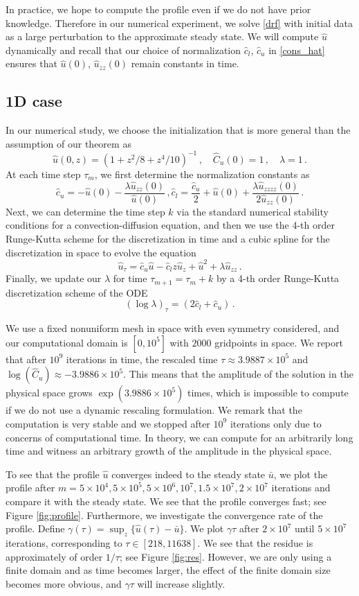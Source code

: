\documentclass[12pt]{caltech_thesis}
\numberwithin{equation}{section}
\begin{document}
In practice, we hope to compute the profile even if we do not have prior knowledge. Therefore in our numerical experiment, we solve  \eqref{drf} with initial data as a large perturbation to the approximate steady state. We will compute $\hat{u}$ dynamically and recall that  our choice of normalization $\hat{c}_l$, $\hat{c}_u$ in \eqref{cons_hat} ensures that $\hat{u}(0)$, $\hat{u}_{zz}(0)$ remain constants in time.  

\subsection{1D case}


In our numerical study, we choose the initialization that is more general than the assumption of our theorem as $$\hat{u}(0,z)=(1+z^2/8+z^4/10)^{-1}\,, \quad\hat{C}_u(0)=1\,, \quad\lambda=1\,.$$
At each time step $\tau_m$, we first determine the normalization constants as $$\hat{c}_u=-\hat{u}(0)-\frac{\lambda\hat{u}_{zz}(0)}{\hat{u}(0)}\,,\hat{c}_l=\frac{\hat{c}_u}{2}+\hat{u}(0)+\frac{\lambda\hat{u}_{zzzz}(0)}{2\hat{u}_{zz}(0)}\,.$$
Next, we can determine the time step $k$ via the standard numerical stability conditions for a convection-diffusion equation, and then we use the 4-th order Runge-Kutta scheme for the discretization in time and a cubic spline for the discretization in space to evolve the equation $$\hat{u}_\tau=\hat{c}_u \hat{u}-\hat{c}_l z\hat{u}_z+\hat{u}^2+\lambda\hat{u}_{zz}\,.$$
Finally, we update our $\lambda$ for time $\tau_{m+1}=\tau_m+k$ by a 4-th order Runge-Kutta discretization scheme  of the ODE $$(\log\lambda)_\tau=(2\hat{c}_l+\hat{c}_u)\,.$$

We use a fixed nonuniform mesh in space with even symmetry considered, and our computational domain is $[0,10^5]$ with $2000$ gridpoints in space. We report that after $10^9$ iterations in time, the rescaled time $\tau\approx3.9887\times10^5$ and $\log(\hat{C}_u)\approx -3.9886\times10^5$. This means that the amplitude of the solution in the physical space grows $\exp(3.9886\times10^5)$ times, which is impossible to compute if we do not use a dynamic rescaling formulation. We remark that the computation is very stable and we stopped after $10^9$ iterations only due to concerns of computational time. In theory, we can compute for an arbitrarily long time and witness an arbitrary growth of the amplitude in the physical space.

To see that the profile $\hat{u}$ converges indeed to the steady state $\bar{u}$, we plot the profile after $m=5 \times 10^4, 5 \times 10^5, 5 \times 10^6, 10^7,1.5  \times 10^7, 2 \times 10^7$ iterations and compare it with the steady state. We see that the profile converges fast; see Figure \ref{fig:profile}. Furthermore, we investigate the convergence rate of the profile. Define $\gamma(\tau)=\sup_{z}\{\hat{u}(\tau)-\bar{u}\}$. We plot $\gamma\tau$ after $2 \times 10^7$ until $5 \times10^7$ iterations, corresponding to $\tau\in[218,11638]$. We see that the residue is approximately of order $1/\tau$; see Figure \ref{fig:res}. However, we are only using a finite domain and as time becomes larger, the effect of the finite domain size becomes more obvious, and $\gamma\tau$ will increase slightly.
\end{document}
